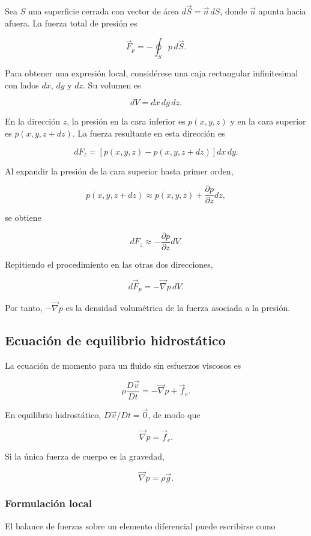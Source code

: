 Sea $S$ una superficie cerrada con vector de área
$d\vec{S}=\vec{n}\,dS$, donde $\vec{n}$ apunta hacia afuera. La fuerza total
de presión es

$$
\vec{F}_p=-\oint_S p\,d\vec{S}.
$$

Para obtener una expresión local, considérese una caja rectangular
infinitesimal con lados $dx$, $dy$ y $dz$. Su volumen es

$$
dV=dx\,dy\,dz.
$$

En la dirección $z$, la presión en la cara inferior es $p(x,y,z)$ y en la
cara superior es $p(x,y,z+dz)$. La fuerza resultante en esta dirección es

$$
dF_z
=\left[p(x,y,z)-p(x,y,z+dz)\right]dx\,dy.
$$

Al expandir la presión de la cara superior hasta primer orden,

$$
p(x,y,z+dz)
\approx p(x,y,z)+\frac{\partial p}{\partial z}dz,
$$

se obtiene

$$
dF_z
\approx-\frac{\partial p}{\partial z}dV.
$$

\figuraGradientePresionClaseCuatro

Repitiendo el procedimiento en las otras dos direcciones,

$$
\boxed{
d\vec{F}_p=-\vec{\nabla}p\,dV
}.
$$

Por tanto, $-\vec{\nabla}p$ es la densidad volumétrica de la fuerza asociada
a la presión.

\subsection{Ecuación de equilibrio hidrostático}

La ecuación de momento para un fluido sin esfuerzos viscosos es

$$
\rho\frac{D\vec{v}}{Dt}
=-\vec{\nabla}p+\vec{f}_e.
$$

En equilibrio hidrostático, $D\vec{v}/Dt=\vec{0}$, de modo que

$$
\boxed{
\vec{\nabla}p=\vec{f}_e
}.
$$

Si la única fuerza de cuerpo es la gravedad,

$$
\boxed{
\vec{\nabla}p=\rho\vec{g}
}.
$$

\subsubsection{Formulación local}

El balance de fuerzas sobre un elemento diferencial puede escribirse como

